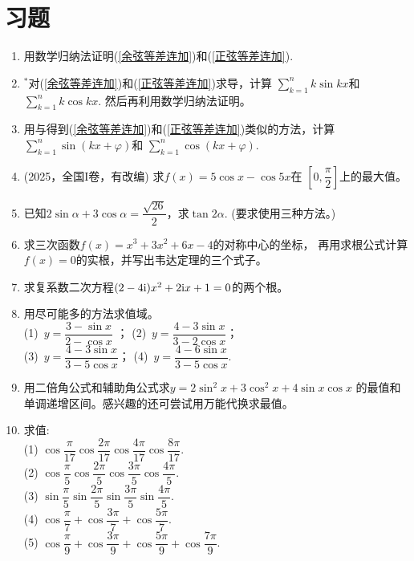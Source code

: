 \section{习题}
\begin{enumerate}[label={\textbf{\thechapter.\arabic*}},leftmargin=
    \inteval{\myenumleftmargin}pt]

\item 用数学归纳法证明(\ref{余弦等差连加})和(\ref{正弦等差连加}).   

\item $ ^* $对(\ref{余弦等差连加})和(\ref{正弦等差连加})求导，计算
$ \sum\limits_{k=1}^{n}k\sin kx $和$ \sum\limits_{k=1}^{n}k\cos kx $. 
然后再利用数学归纳法证明。

\item 用与得到(\ref{余弦等差连加})和(\ref{正弦等差连加})类似的方法，计算
$ \sum\limits_{k=1}^{n}\sin(kx+\varphi) $和
$ \sum\limits_{k=1}^{n}\cos(kx+\varphi) $. 

\item (2025，全国I卷，有改编) 求$f(x)=5\cos x-\cos5x$在
$\left[0,\dfrac{\pi}{2}\right]$上的最大值。

\item 已知$ 2\sin\alpha+3\cos\alpha=\dfrac{\sqrt{26}}{2} $，求$ \tan2\alpha $.
(要求使用三种方法。)

\item 求三次函数$ f(x)=x^3+3x^2+6x-4 $的对称中心的坐标，
再用求根公式计算$ f(x)=0 $的实根，并写出韦达定理的三个式子。

\item 求复系数二次方程$ (2-4\mathrm{i})x^2+2\mathrm{i} x+1=0 $的两个根。

\item 用尽可能多的方法求值域。\\
(1)\ $ y=\dfrac{3-\sin x}{2-\cos x} $ ；\quad 
(2)\ $ y=\dfrac{4-3\sin x}{3-2\cos x} $；\\
(3)\ $ y=\dfrac{4-3\sin x}{3-5\cos x} $；\quad
(4)\ $ y=\dfrac{4-6\sin x}{3-5\cos x} $.

\item 用二倍角公式和辅助角公式求$ y=2\sin^2 x+3\cos^2 x+4\sin x\cos x $
的最值和单调递增区间。感兴趣的还可尝试用万能代换求最值。

\item 求值: \\
(1) $ \cos\dfrac{\pi}{17}\cos\dfrac{2\pi}{17}\cos\dfrac{4\pi}{17}
\cos\dfrac{8\pi}{17} $. \\
(2) $ \cos\dfrac{\pi}{5}\cos\dfrac{2\pi}{5}\cos\dfrac{3\pi}{5}
\cos\dfrac{4\pi}{5} $. \\
(3) $ \sin\dfrac{\pi}{5}\sin\dfrac{2\pi}{5}\sin\dfrac{3\pi}{5}
\sin\dfrac{4\pi}{5} $. \\
(4) $ \cos\dfrac{\pi}{7}+\cos\dfrac{3\pi}{7}+\cos\dfrac{5\pi}{7} $. \\
(5) $ \cos\dfrac{\pi}{9}+\cos\dfrac{3\pi}{9}+\cos\dfrac{5\pi}{9}+\cos\dfrac{7\pi}{9} $. 


\end{enumerate}
